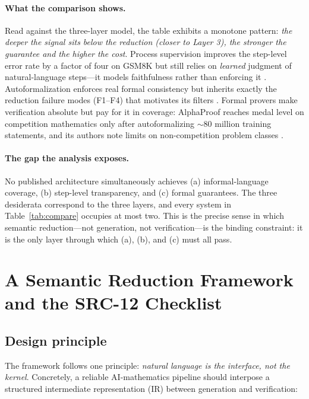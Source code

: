 \documentclass[11pt,a4paper]{article}
\begin{document}
\paragraph{What the comparison shows.} Read against the three-layer model, the table exhibits a monotone pattern: \emph{the deeper the signal sits below the reduction (closer to Layer 3), the stronger the guarantee and the higher the cost}. Process supervision improves the step-level error rate by a factor of four on GSM8K but still relies on \emph{learned} judgment of natural-language steps---it models faithfulness rather than enforcing it \citep{uesato2022feedback}. Autoformalization enforces real formal consistency but inherits exactly the reduction failure modes (F1--F4) that motivates its filters \citep{zhou2024dtv}. Formal provers make verification absolute but pay for it in coverage: AlphaProof reaches medal level on competition mathematics only after autoformalizing $\sim$80 million training statements, and its authors note limits on non-competition problem classes \citep{hubert2025alphaproof}.

\paragraph{The gap the analysis exposes.} No published architecture simultaneously achieves (a) informal-language coverage, (b) step-level transparency, and (c) formal guarantees. The three desiderata correspond to the three layers, and every system in Table~\ref{tab:compare} occupies at most two. This is the precise sense in which semantic reduction---not generation, not verification---is the binding constraint: it is the only layer through which (a), (b), and (c) must all pass.

\section{A Semantic Reduction Framework and the SRC-12 Checklist}\label{sec:framework}

\subsection{Design principle}
The framework follows one principle: \emph{natural language is the interface, not the kernel}. Concretely, a reliable AI-mathematics pipeline should interpose a structured intermediate representation (IR) between generation and verification:
\end{document}

